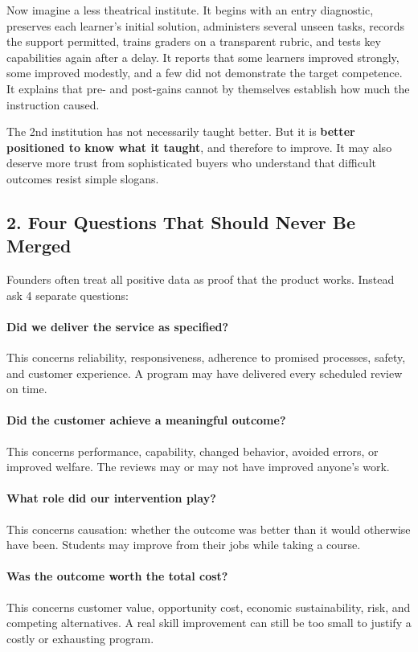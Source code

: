 Now imagine a less theatrical institute. It begins with an entry diagnostic, preserves each learner's initial solution, administers several unseen tasks, records the support permitted, trains graders on a transparent rubric, and tests key capabilities again after a delay. It reports that some learners improved strongly, some improved modestly, and a few did not demonstrate the target competence. It explains that pre- and post-gains cannot by themselves establish how much the instruction caused.

The 2nd institution has not necessarily taught better. But it is \textbf{better positioned to know what it taught}, and therefore to improve. It may also deserve more trust from sophisticated buyers who understand that difficult outcomes resist simple slogans.

\subsection*{2. Four Questions That Should Never Be Merged}

Founders often treat all positive data as proof that the product works. Instead ask 4 separate questions:

\paragraph*{Did we deliver the service as specified?} This concerns reliability, responsiveness, adherence to promised processes, safety, and customer experience. A program may have delivered every scheduled review on time.

\paragraph*{Did the customer achieve a meaningful outcome?} This concerns performance, capability, changed behavior, avoided errors, or improved welfare. The reviews may or may not have improved anyone's work.

\paragraph*{What role did our intervention play?} This concerns causation: whether the outcome was better than it would otherwise have been. Students may improve from their jobs while taking a course.

\paragraph*{Was the outcome worth the total cost?} This concerns customer value, opportunity cost, economic sustainability, risk, and competing alternatives. A real skill improvement can still be too small to justify a costly or exhausting program.

